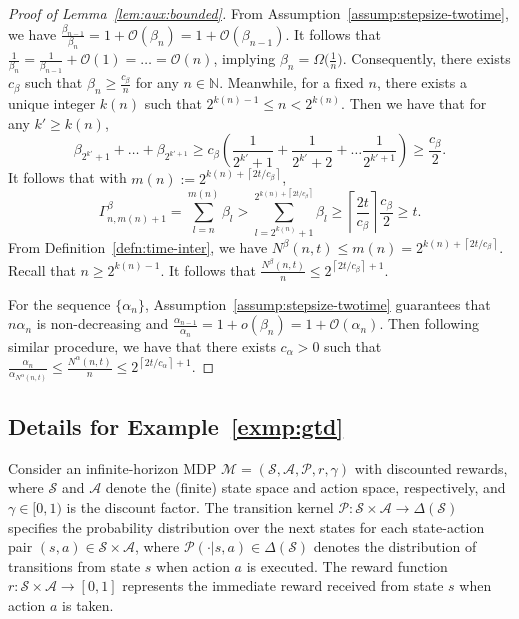 \documentclass[11pt]{article}
\theoremstyle{plain}
\theoremstyle{definition}
\def\MM{{\mathcal M}}
\def\AM{{\mathcal A}}
\def\OM{{\mathcal O}}
\def\PM{{\mathcal P}}
\def\SM{{\mathcal S}}
\def\NB{{\mathbb N}}
\newcommand{\ssum}[3]{\sum\limits_{{#1}={#2}}^{#3}}
\begin{document}
\begin{appendix}
\begin{proof}[Proof of Lemma~\ref{lem:aux:bounded}]
From Assumption~\ref{assump:stepsize-twotime}, we have 
$\frac{ \beta_{n-1} }{ \beta_{n} } = 1 + \OM (\beta_{n}) = 1 + \OM (\beta_{n-1}) $.
It follows that $\frac{1}{\beta_{n}} = \frac{1}{\beta_{n-1}} + \OM(1) = \dots = \OM(n) $, implying $\beta_{n} = \Omega \big( \frac{1}{n} \big)$.
Consequently, 
there exists $c_\beta$ such that $\beta_{n} \ge \frac{c_\beta}{n} $ for any $n \in \NB$.
Meanwhile, for a fixed $n$, there exists a unique integer $k(n)$ such that $ 2^{k(n) - 1} \le n < 2^{k(n)} $.
Then we have that for any $k' \ge k(n)$,
\begin{equation*}
    \beta_{2^{k'} + 1} + \dots + \beta_{ 2^{k' + 1} }
    \ge c_\beta \left( \frac{1}{ 2^{k'} + 1 } + \frac{1}{ 2^{k'} + 2 } + \dots \frac{1}{ 2^{k'+1} } \right)
    \ge \frac{ c_\beta }{2}.
\end{equation*}
It follows that with $m(n) := 2^{ k(n) + \left\lceil 2t/ c_\beta \right\rceil } $,
\begin{equation*}
    \Gamma^\beta_{n, m(n)+1}
    = \ssum{l}{n}{m(n)} \beta_{l}
    > \ssum{l}{2^{k(n)}+1}{2^{k(n) + \left\lceil 2t/c_\beta \right\rceil } } \beta_{l}
    \ge \left\lceil \frac{2t}{c_\beta} \right\rceil \frac{c_\beta}{2} \ge t.
\end{equation*}
From Definition~\ref{defn:time-inter}, we have $N^\beta(n,t) \le m(n) = 2^{ k(n) + \left\lceil 2t/c_\beta \right\rceil }$.
Recall that $n \ge 2^{k(n)-1}$. It follows that $\frac{ N^\beta(n,t) }{n} \le 2^{ \left\lceil 2t/c_\beta \right\rceil + 1 }$.

For the sequence $\{ \alpha_{n} \}$, Assumption~\ref{assump:stepsize-twotime} guarantees that $n \alpha_{n}$ is non-decreasing and $\frac{\alpha_{n-1}}{\alpha_{n}} = 1 + o(\beta_{n}) = 1 + \OM(\alpha_{n})$.
Then following similar procedure, we have that there exists $c_\alpha > 0$ such that $ \frac{ \alpha_{n} }{ \alpha_{ N^\alpha(n,t) } } \le \frac{ N^\alpha(n,t) }{n} \le 2^{ \left\lceil 2t/c_\alpha \right\rceil + 1 }$.
\end{proof}

\subsection{Details for Example~\ref{exmp:gtd}}
\label{append:exmp}

Consider an infinite-horizon MDP $\MM=(\SM, \AM, \PM ,r, \gamma)$ with discounted rewards, where $\SM$ and $\AM$ denote the (finite) state space and action space, respectively, and $\gamma \in [0,1)$ is the discount factor.
The transition kernel $\PM \colon \SM \times \AM \rightarrow \Delta(\SM)$ specifies the probability distribution over the next states for each state-action pair $(s,a) \in \SM \times \AM$, where $\PM(\cdot | s,a) \in \Delta(\SM) $ denotes the distribution of transitions from state $s$ when action $a$ is executed. The reward function $r\colon \SM \times \AM \rightarrow [0,1]$ represents the immediate reward received from state $s$ when action $a$ is taken.


\end{appendix}
\end{document}
